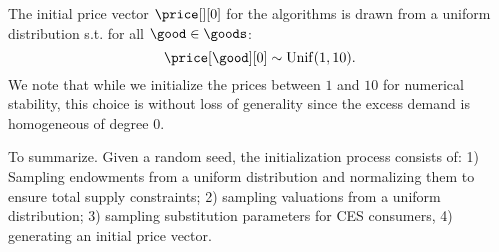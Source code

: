 The initial price vector $\price[][0]$ for the algorithms is drawn from a uniform distribution s.t. for all $\good \in \goods$:
\[
\price[\good][0] \sim \mathrm{Unif}(1, 10) .
\]
We note that while we initialize the prices between $1$ and $10$ for numerical stability, this choice is without loss of generality since the excess demand is homogeneous of degree $0$.

To summarize. Given a random seed, the initialization process consists of:
1) Sampling endowments from a uniform distribution and normalizing them to ensure total supply constraints; 2) sampling valuations from a uniform distribution; 3) sampling substitution parameters for CES consumers, 4) generating an initial price vector.